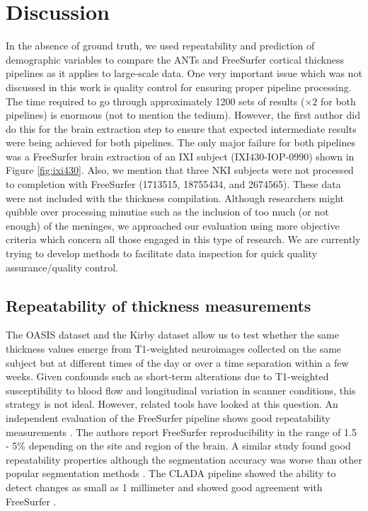 \section{Discussion}
In the absence of ground truth, we used repeatability and prediction of
demographic variables to compare the ANTs and FreeSurfer cortical 
thickness pipelines as it applies to large-scale data.  One very important
issue which was not discussed in this work is quality control for 
ensuring proper pipeline processing.  The time required to go through 
approximately 1200 sets of results ($\times 2$ for both pipelines) is
enormous (not to mention the tedium).  However, the first
author did do this for the brain extraction step to ensure that expected
intermediate results were being achieved for both pipelines.  The only 
major failure for both pipelines was a FreeSurfer brain extraction of
an IXI subject (IXI430-IOP-0990) shown in Figure \ref{fig:ixi430}. 
Also, we mention that three NKI subjects were not processed to completion
with FreeSurfer (1713515, 18755434, and 2674565).  These data were not
included with the thickness compilation.
Although  researchers might quibble over processing minutiae such as the 
inclusion of too much (or not enough) of the meninges, we approached
our evaluation using more objective criteria which concern all those
engaged in this type of research.  We are currently trying to develop methods
to facilitate data inspection for quick quality assurance/quality control.


\subsection{Repeatability of thickness measurements}
The OASIS dataset and the Kirby dataset allow us to test whether the same
thickness values emerge from T1-weighted
neuroimages collected on the same subject but at different times of
the day or over a time separation within a few weeks.  Given confounds 
such as short-term alterations due to T1-weighted susceptibility to
blood flow \cite{Franklin2013,Salgado-Pineda2006,Yamasue2007} and
longitudinal variation in scanner conditions, 
this strategy is not ideal.  However, related
tools have looked at this question. 
An independent evaluation of the FreeSurfer pipeline shows good
repeatability measurements \cite{jovicich2013}. The authors report
FreeSurfer reproducibility in the range of 1.5 - 5\% depending on the
site and region of the brain.  A similar study found good
repeatability properties although the segmentation accuracy was worse 
than other popular segmentation methods \cite{eggert2012}.
The CLADA pipeline showed the ability to detect
changes as small as 1 millimeter and showed good agreement with
FreeSurfer \cite{nakamura2011}. 

